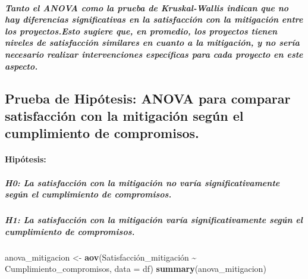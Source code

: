 \documentclass[
]{article}
\newenvironment{Shaded}{\begin{snugshade}}{\end{snugshade}}
\newcommand{\AttributeTok}[1]{\textcolor[rgb]{0.13,0.29,0.53}{#1}}
\newcommand{\FunctionTok}[1]{\textcolor[rgb]{0.13,0.29,0.53}{\textbf{#1}}}
\newcommand{\NormalTok}[1]{#1}
\newcommand{\OtherTok}[1]{\textcolor[rgb]{0.56,0.35,0.01}{#1}}
\newcommand{\SpecialCharTok}[1]{\textcolor[rgb]{0.81,0.36,0.00}{\textbf{#1}}}
\begin{document}
\subparagraph{\texorpdfstring{\emph{Tanto el ANOVA como la prueba de
Kruskal-Wallis indican que no hay diferencias significativas en la
satisfacción con la mitigación entre los proyectos.Esto sugiere que, en
promedio, los proyectos tienen niveles de satisfacción similares en
cuanto a la mitigación, y no sería necesario realizar intervenciones
específicas para cada proyecto en este
aspecto.}}{Tanto el ANOVA como la prueba de Kruskal-Wallis indican que no hay diferencias significativas en la satisfacción con la mitigación entre los proyectos.Esto sugiere que, en promedio, los proyectos tienen niveles de satisfacción similares en cuanto a la mitigación, y no sería necesario realizar intervenciones específicas para cada proyecto en este aspecto.}}\label{tanto-el-anova-como-la-prueba-de-kruskal-wallis-indican-que-no-hay-diferencias-significativas-en-la-satisfacciuxf3n-con-la-mitigaciuxf3n-entre-los-proyectos.esto-sugiere-que-en-promedio-los-proyectos-tienen-niveles-de-satisfacciuxf3n-similares-en-cuanto-a-la-mitigaciuxf3n-y-no-seruxeda-necesario-realizar-intervenciones-especuxedficas-para-cada-proyecto-en-este-aspecto.}

\subsection{\texorpdfstring{\textbf{Prueba de Hipótesis:} ANOVA para
comparar satisfacción con la mitigación según el cumplimiento de
compromisos.}{Prueba de Hipótesis: ANOVA para comparar satisfacción con la mitigación según el cumplimiento de compromisos.}}\label{prueba-de-hipuxf3tesis-anova-para-comparar-satisfacciuxf3n-con-la-mitigaciuxf3n-seguxfan-el-cumplimiento-de-compromisos.}

\paragraph{Hipótesis:}\label{hipuxf3tesis-7}

\subparagraph{H0: La satisfacción con la mitigación no varía
significativamente según el cumplimiento de
compromisos.}\label{h0-la-satisfacciuxf3n-con-la-mitigaciuxf3n-no-varuxeda-significativamente-seguxfan-el-cumplimiento-de-compromisos.}

\subparagraph{H1: La satisfacción con la mitigación varía
significativamente según el cumplimiento de
compromisos.}\label{h1-la-satisfacciuxf3n-con-la-mitigaciuxf3n-varuxeda-significativamente-seguxfan-el-cumplimiento-de-compromisos.}

\begin{Shaded}
\begin{Highlighting}[]
\NormalTok{anova\_mitigacion }\OtherTok{\textless{}{-}} \FunctionTok{aov}\NormalTok{(Satisfacción\_mitigación }\SpecialCharTok{\textasciitilde{}}\NormalTok{ Cumplimiento\_compromisos, }\AttributeTok{data =}\NormalTok{ df)}
\FunctionTok{summary}\NormalTok{(anova\_mitigacion)}
\end{Highlighting}
\end{Shaded}
\end{document}
